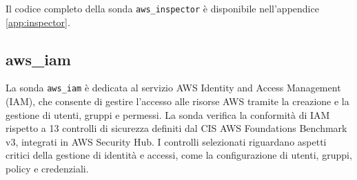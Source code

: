 Il codice completo della sonda \texttt{aws\_inspector} è disponibile nell'appendice \ref{app:inspector}.

\subsection{aws\_iam}
\label{sec:iam}

La sonda \texttt{aws\_iam} è dedicata al servizio AWS Identity and Access Management (IAM), che consente di gestire l'accesso alle risorse AWS tramite la creazione e la gestione di utenti, gruppi e permessi. La sonda verifica la conformità di IAM rispetto a 13 controlli di sicurezza definiti dal CIS AWS Foundations Benchmark v3, integrati in AWS Security Hub. I controlli selezionati riguardano aspetti critici della gestione di identità e accessi, come la configurazione di utenti, gruppi, policy e credenziali.
